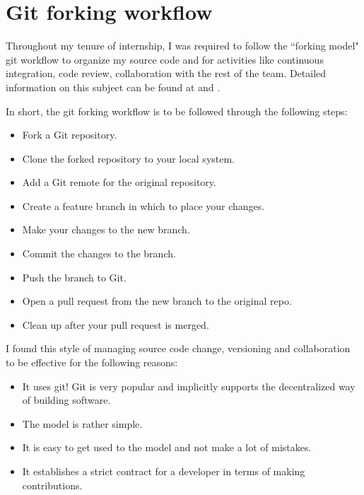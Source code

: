 \documentclass[a4paper, 12pt, oneside]{report}
\begin{document}
  \newpage
  
  \chapter{Git forking workflow}
  
  \normalsize Throughout my tenure of internship, I was required to follow the ``forking model" git workflow to organize my source code and for activities like continuous integration, code review, collaboration with the rest of the team. Detailed information on this subject can be found at \cite{UsingtheForkandBranchGitWorkflowScottsWeblogTheweblogofanITprofocusingoncloudcomputingKubernetesLinuxcontainersandnetworking-2020-01-01} and \cite{ForkingWorkflowAtlassianGitTutorial-2020-02-12}. 
	
  \vspace{0.2cm}	
  \noindent In short, the git forking workflow is to be followed through the following steps:
  
  \begin{itemize}
  	\item	Fork a Git repository.
  	\item	Clone the forked repository to your local system.
  	\item	Add a Git remote for the original repository.
  	\item	Create a feature branch in which to place your changes.
  	\item	Make your changes to the new branch.
  	\item	Commit the changes to the branch.
  	\item	Push the branch to Git.
  	\item	Open a pull request from the new branch to the original repo.
  	\item	Clean up after your pull request is merged.
  \end{itemize}

  \normalsize \noindent I found this style of managing source code change, versioning and collaboration to be effective for the following reasons:
  
  \begin{itemize}
  	\item	It uses git! Git is very popular and implicitly supports the decentralized way of building software.
  	\item	The model is rather simple.
  	\item	It is easy to get used to the model and not make a lot of mistakes. 
  	\item   It establishes a strict contract for a developer in terms of making contributions.
  \end{itemize}  
    
  \printbibliography[heading = bibintoc]
\end{document}
